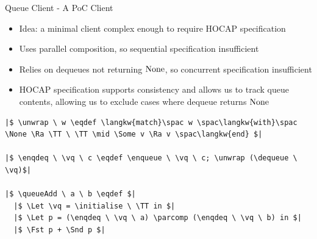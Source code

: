 \documentclass[9pt]{beamer}
\newcommand{\initialise}{\operatorname{initialize}}
\newcommand{\enqueue}{\operatorname{enqueue}}
\newcommand{\dequeue}{\operatorname{dequeue}}
\newcommand{\unwrap}{\operatorname{unwrap}}
\newcommand{\enqdeq}{\operatorname{enqdeq}}
\newcommand{\queueAdd}{\operatorname{queueAdd}}
\newcommand{\parcomp}{\ensuremath{\mathbin{||}}}
\newcommand{\vq}{v_q}
\begin{document}
\begin{frame}[fragile]{Queue Client - A PoC Client}
  \begin{itemize}
    \item Idea: a minimal client complex enough to require HOCAP specification
    \item Uses parallel composition, so sequential specification insufficient
    \item Relies on dequeues not returning $\operatorname{None}$, so concurrent specification insufficient
    \item HOCAP specification supports consistency and allows us to track queue contents, allowing us to exclude cases where dequeue returns $\operatorname{None}$ 
  \end{itemize}
  \begin{verbatim}
|$ \unwrap \ w \eqdef \langkw{match}\spac w \spac\langkw{with}\spac \None \Ra \TT \ \TT \mid \Some v \Ra v \spac\langkw{end} $|
  
|$ \enqdeq \ \vq \ c \eqdef \enqueue \ \vq \ c; \unwrap (\dequeue \ \vq)$|
  
|$ \queueAdd \ a \ b \eqdef $|
  |$ \Let \vq = \initialise \ \TT in $|
  |$ \Let p = (\enqdeq \ \vq \ a) \parcomp (\enqdeq \ \vq \ b) in $|
  |$ \Fst p + \Snd p $|
  \end{verbatim}
\end{frame}
\end{document}
